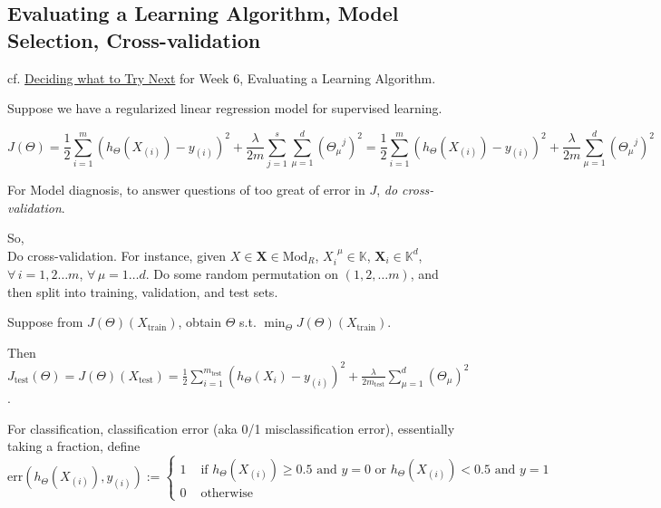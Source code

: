 \documentclass[10pt]{amsart}
\begin{document}
\begin{multicols*}{2}
\section{Evaluating a Learning Algorithm, Model Selection, Cross-validation}  

cf. \href{https://www.coursera.org/learn/machine-learning/lecture/OVM4M/deciding-what-to-try-next}{Deciding what to Try Next} for Week 6, Evaluating a Learning Algorithm.  

Suppose we have a regularized linear regression model for supervised learning.  

\begin{equation}
	J(\Theta) = \frac{1}{2} \sum_{i=1}^m (h_{\Theta}(X_{(i)}) - y_{(i)} )^2 + \frac{\lambda}{2m} \sum_{j=1}^s \sum_{\mu=1}^d (\Theta_{\mu}^{\  \  \  j })^2 =  \frac{1}{2} \sum_{i=1}^m (h_{\Theta}(X_{(i)} ) - y_{(i)} )^2 + \frac{\lambda}{2m} \sum_{\mu =1}^d (\Theta_{\mu}^{ \  \  \  j })^2 
\end{equation}

For Model diagnosis, to answer questions of too great of error in $J$, \emph{do cross-validation}.  

So, \\

Do cross-validation.  For instance, given $X \in \mathbf{X} \in \text{Mod}_{R}$, $X_i^{ \  \  \mu } \in \mathbb{K}$, $\mathbf{X}_i \in \mathbb{K}^d$, \, $\forall \, i =1,2\dots m$, $\forall \, \mu =1\dots d$.  Do some random permutation on $(1,2,\dots m)$, and then split into training, validation, and test sets.  

Suppose from $J(\Theta)(X_{\text{train}})$, obtain $\Theta$ s.t. $\min_{\Theta} J(\Theta)(X_{\text{train}})$.  

Then $J_{\text{test}}(\Theta) = J(\Theta)(X_{\text{test}}) = \frac{1}{2} \sum_{i=1}^{m_{\text{test}}} (h_{\Theta}(X_i) - y_{(i)} )^2 + \frac{\lambda}{2m_{\text{test}}} \sum_{\mu=1}^d (\Theta_{\mu})^2 $.  

For classification, classification error (aka 0/1 misclassification error), essentially taking a fraction, define
\begin{equation}
	\text{err}(h_{\Theta}(X_{(i)} ), y_{(i)} ) := \begin{cases} 1 & \text{ if } h_{\Theta}(X_{(i)} ) \geq 0.5 \text{ and } y=0 \text{ or } h_{\Theta}(X_{(i)}) < 0.5 \text{ and } y=1 \\ 
0 & \text{ otherwise } \end{cases}
\end{equation}


\end{multicols*}
\end{document}
